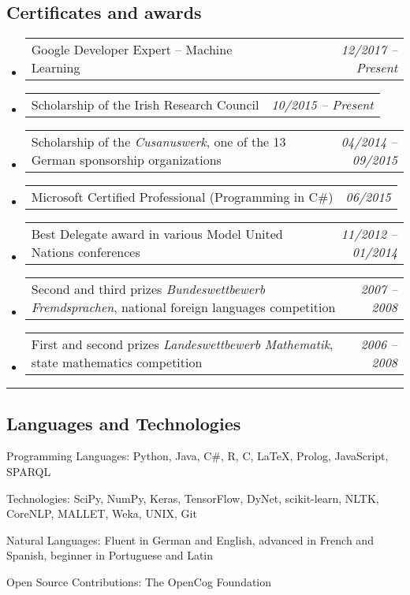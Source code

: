 \documentclass[10pt,letterpaper]{article}
\makeatletter
\newenvironment{indentsection}[1]%
{\begin{list}{}%
	{\setlength{\leftmargin}{#1}}%
	\item[]%
}
{\end{list}}
\newcommand{\headerrow}[2]
{\begin{tabular*}{\linewidth}{l@{\extracolsep{\fill}}r}
	#1 &
	#2 \\
\end{tabular*}}
\makeatother
\begin{document}
\subsection*{Certificates and awards}

\begin{itemize}
	\parskip=0.1em
	
	\item 
	\headerrow
		{Google Developer Expert -- Machine Learning}
		{\emph{12/2017 -- Present}}
	\item 
	\headerrow
		{Scholarship of the Irish Research Council}
		{\emph{10/2015 -- Present}}
	\item 
	\headerrow
		{Scholarship of the \emph{Cusanuswerk}, one of the 13 German sponsorship organizations}
		{\emph{04/2014 -- 09/2015}}	
	\item 
	\headerrow
		{Microsoft Certified Professional (Programming in C\#)}
		{\emph{06/2015}}
	\item 
	\headerrow
		{Best Delegate award in various Model United Nations conferences}
		{\emph{11/2012 -- 01/2014}}
	\item 
	\headerrow
		{Second and third prizes \emph{Bundeswettbewerb Fremdsprachen}, national foreign languages competition}
		{\emph{2007 -- 2008}}
	\item 
	\headerrow
		{First and second prizes \emph{Landeswettbewerb Mathematik}, state mathematics competition}
		{\emph{2006 -- 2008}}
	

\end{itemize}

\hrule
\vspace{-0.4em}
\subsection*{Languages and Technologies}

\begin{indentsection}{\parindent}
\begin{description*}
	\item[Programming Languages:]
	Python, Java, C\#, R, C, \LaTeX, Prolog, JavaScript, SPARQL
	\item[Technologies:]
	SciPy, NumPy, Keras, TensorFlow, DyNet, scikit-learn, NLTK, CoreNLP, MALLET, Weka, UNIX, Git
	\item[Natural Languages:]
	Fluent in German and English, advanced in French and Spanish, beginner in Portuguese and Latin	
	\item[Open Source Contributions:]
	The OpenCog Foundation
\end{description*}
\end{indentsection}
\end{document}
